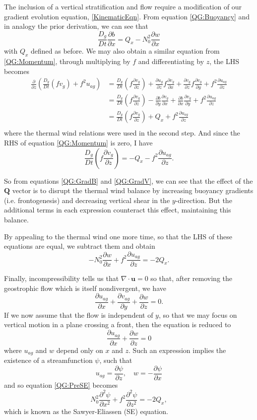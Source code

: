 \documentclass[11pt,onecolumn,oneside]{article}
\newcommand{\pdiff}[2]{\frac{\partial #1}{\partial #2}}
\begin{document}
The inclusion of a vertical stratification and flow require a modification of our gradient evolution equation, \eqref{KinematicEqn}. From equation \eqref{QG:Buoyancy} and in analogy the prior derivation, we can see that
\begin{equation}\label{QG:GradB}
\frac{D_g}{Dt} \pdiff{b}{x} = Q_x - N_0^2 \pdiff{w}{x}
\end{equation}
with $Q_x$ defined as before. We may also obtain a similar equation from \eqref{QG:Momentum}, through multiplying by $f$ and differentiating by $z$, the LHS becomes
\[ \begin{split}
\pdiff{}{z} \left(\frac{D_g}{Dt} (f v_g) + f^2 u_{ag} \right) &= \frac{D_g}{Dt} \left(f \pdiff{v_g}{z}\right) + \pdiff{u_g}{z} f \pdiff{v_g}{x} + \pdiff{v_g}{z} f \pdiff{v_g}{y} + f^2 \pdiff{u_{ag}}{z} \\
 &= \frac{D_g}{Dt} \left(f \pdiff{v_g}{z}\right) - \pdiff{b}{y} \pdiff{v_g}{x} + \pdiff{b}{x} \pdiff{v_g}{y} + f^2 \pdiff{u_{ag}}{z} \\
 &=  \frac{D_g}{Dt} \left(f \pdiff{v_g}{z}\right) + Q_x + f^2 \pdiff{u_{ag}}{z}\\
\end{split} \]
where the thermal wind relations were used in the second step. And since the RHS of equation \eqref{QG:Momentum} is zero, I have
\begin{equation}\label{QG:GradV}
\frac{D_g}{Dt} \left(f \pdiff{v_g}{z}\right) = -Q_x - f^2 \pdiff{u_{ag}}{z}.
\end{equation}

So from equations \eqref{QG:GradB} and \eqref{QG:GradV}, we can see that the effect of the $\mathbf{Q}$ vector is to disrupt the thermal wind balance by increasing buoyancy gradients (i.e. frontogenesis) and decreasing vertical shear in the $y$-direction. But the additional terms in each expression counteract this effect, maintaining this balance.

By appealing to the thermal wind one more time, so that the LHS of these equations are equal, we subtract them and obtain
\begin{equation}\label{QG:PreSE}
-N_0^2 \pdiff{w}{x} + f^2 \pdiff{u_{ag}}{z} = -2Q_x.
\end{equation}

Finally, incompressibility tells us that $\nabla \cdot \mathbf{u} = 0$ so that, after removing the geostrophic flow which is itself nondivergent, we have
\[
\pdiff{u_{ag}}{x} + \pdiff{v_{ag}}{y} + \pdiff{w}{z} = 0.
\]
If we now assume that the flow is independent of $y$, so that we may focus on vertical motion in a plane crossing a front, then the equation is reduced to
\[
\pdiff{u_{ag}}{x} + \pdiff{w}{z} = 0
\]
where $u_{ag}$ and $w$ depend only on $x$ and $z$. Such an expression implies the existence of a streamfunction $\psi$, such that
\[
u_{ag} = \pdiff{\psi}{z}, \quad w = -\pdiff{\psi}{x}
\]
and so equation \eqref{QG:PreSE} becomes
\begin{equation}\label{QG:SE}
N_0^2 \pdiff{^2 \psi}{x^2} + f^2 \pdiff{^2 \psi}{z^2} = -2Q_x,
\end{equation}
which is known as the Sawyer-Eliassen (SE) equation.
\end{document}
